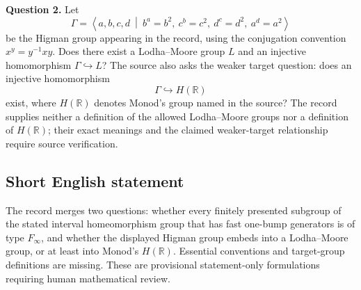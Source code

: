 \documentclass[11pt]{article}
\newcommand{\R}{\mathbb{R}}
\begin{document}
\textbf{Question 2.} Let
\[
\Gamma=\left\langle a,b,c,d\ \middle|\ b^a=b^2,\ c^b=c^2,\ d^c=d^2,\ a^d=a^2\right\rangle
\]
be the Higman group appearing in the record, using the conjugation convention \(x^y=y^{-1}xy\). Does there exist a Lodha--Moore group \(L\) and an injective homomorphism \(\Gamma\hookrightarrow L\)? The source also asks the weaker target question: does an injective homomorphism
\[
\Gamma\hookrightarrow H(\R)
\]
exist, where \(H(\R)\) denotes Monod's group named in the source? The record supplies neither a definition of the allowed Lodha--Moore groups nor a definition of \(H(\R)\); their exact meanings and the claimed weaker-target relationship require source verification.
\subsection{Short English statement}
The record merges two questions: whether every finitely presented subgroup of the stated interval homeomorphism group that has fast one-bump generators is of type \(F_\infty\), and whether the displayed Higman group embeds into a Lodha--Moore group, or at least into Monod's \(H(\R)\). Essential conventions and target-group definitions are missing. These are provisional statement-only formulations requiring human mathematical review.
\end{document}

